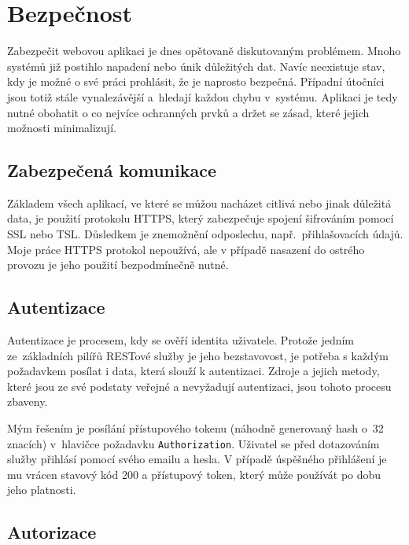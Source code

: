 \section{Bezpečnost}
\label{sec:security}


Zabezpečit webovou aplikaci je dnes opětovaně diskutovaným problémem. Mnoho systémů již postihlo napadení
nebo únik důležitých dat. Navíc neexistuje stav, kdy je možné o své práci prohlásit, že je naprosto
bezpečná. Případní útočníci jsou totiž stále vynalezávější a~hledají každou chybu v~systému.
Aplikaci je tedy nutné obohatit o co nejvíce ochranných prvků a držet se zásad,
které jejich možnosti minimalizují.

\subsection{Zabezpečená komunikace}

Základem všech aplikací, ve které se můžou nacházet citlivá nebo jinak důležitá data,
je použití protokolu HTTPS, který zabezpečuje spojení šifrováním pomocí SSL nebo TSL.
Důsledkem je znemožnění odposlechu, např.~přihlašovacích údajů. Moje práce HTTPS protokol nepoužívá,
ale v případě nasazení do ostrého provozu je jeho použití bezpodmínečně nutné.

\subsection{Autentizace}

Autentizace je procesem, kdy se ověří identita uživatele. Protože jedním ze~základních pilířů RESTové
služby je jeho bezstavovost, je potřeba s každým požadavkem posílat i data, která slouží k autentizaci.
Zdroje a jejich metody, které jsou ze své podstaty veřejné a nevyžadují autentizaci, jsou tohoto procesu zbaveny.

Mým řešením je posílání přístupového tokenu (náhodně generovaný hash o~32 znacích) v~hlavičce požadavku
\texttt{Authorization}. Uživatel se před dotazováním služby přihlásí pomocí svého emailu a hesla.
V případě úspěšného přihlášení je mu vrácen stavový kód 200 a přístupový token, který může používát po dobu jeho platnosti.

\subsection{Autorizace}

